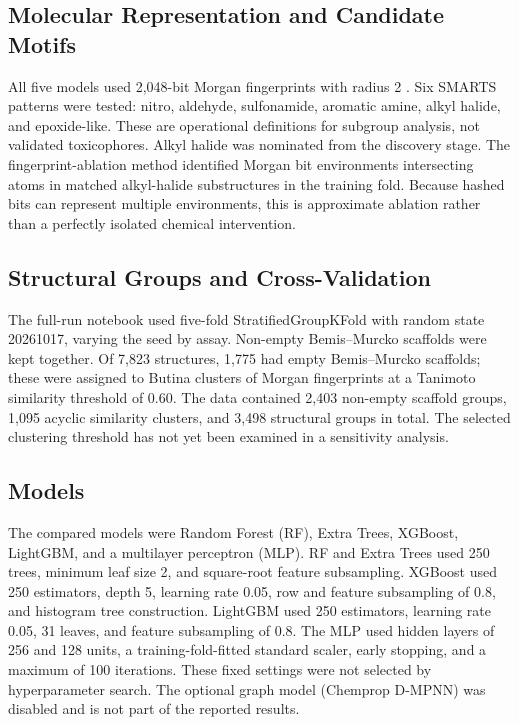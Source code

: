 \documentclass[conference]{IEEEtran}
\begin{document}
\subsection{Molecular Representation and Candidate Motifs}
All five models used 2,048-bit Morgan fingerprints with radius 2 \cite{rogers2010}. Six SMARTS patterns were tested: nitro, aldehyde, sulfonamide, aromatic amine, alkyl halide, and epoxide-like. These are operational definitions for subgroup analysis, not validated toxicophores. Alkyl halide was nominated from the discovery stage. The fingerprint-ablation method identified Morgan bit environments intersecting atoms in matched alkyl-halide substructures in the training fold. Because hashed bits can represent multiple environments, this is approximate ablation rather than a perfectly isolated chemical intervention.

\subsection{Structural Groups and Cross-Validation}
The full-run notebook used five-fold StratifiedGroupKFold with random state 20261017, varying the seed by assay. Non-empty Bemis--Murcko scaffolds were kept together. Of 7,823 structures, 1,775 had empty Bemis--Murcko scaffolds; these were assigned to Butina clusters of Morgan fingerprints at a Tanimoto similarity threshold of 0.60. The data contained 2,403 non-empty scaffold groups, 1,095 acyclic similarity clusters, and 3,498 structural groups in total. The selected clustering threshold has not yet been examined in a sensitivity analysis.

\subsection{Models}
The compared models were Random Forest (RF), Extra Trees, XGBoost, LightGBM, and a multilayer perceptron (MLP). RF and Extra Trees used 250 trees, minimum leaf size 2, and square-root feature subsampling. XGBoost used 250 estimators, depth 5, learning rate 0.05, row and feature subsampling of 0.8, and histogram tree construction. LightGBM used 250 estimators, learning rate 0.05, 31 leaves, and feature subsampling of 0.8. The MLP used hidden layers of 256 and 128 units, a training-fold-fitted standard scaler, early stopping, and a maximum of 100 iterations. These fixed settings were not selected by hyperparameter search. The optional graph model (Chemprop D-MPNN) was disabled and is not part of the reported results.
\end{document}
